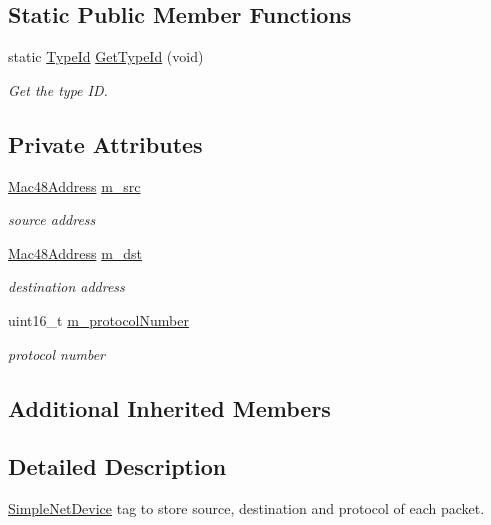\subsection*{Static Public Member Functions}
\begin{DoxyCompactItemize}
\item 
static \hyperlink{classns3_1_1TypeId}{Type\+Id} \hyperlink{classns3_1_1SimpleTag_ab66449eb05fe25c32f740d2e8b469e14}{Get\+Type\+Id} (void)
\begin{DoxyCompactList}\small\item\em Get the type ID. \end{DoxyCompactList}\end{DoxyCompactItemize}
\subsection*{Private Attributes}
\begin{DoxyCompactItemize}
\item 
\hyperlink{classns3_1_1Mac48Address}{Mac48\+Address} \hyperlink{classns3_1_1SimpleTag_a912a8d6c2e5cd521027b914dbdb87782}{m\+\_\+src}
\begin{DoxyCompactList}\small\item\em source address \end{DoxyCompactList}\item 
\hyperlink{classns3_1_1Mac48Address}{Mac48\+Address} \hyperlink{classns3_1_1SimpleTag_a274838a625af595eb1e15dbf58415d80}{m\+\_\+dst}
\begin{DoxyCompactList}\small\item\em destination address \end{DoxyCompactList}\item 
uint16\+\_\+t \hyperlink{classns3_1_1SimpleTag_a3af52bc0388404c543ab680733512f79}{m\+\_\+protocol\+Number}
\begin{DoxyCompactList}\small\item\em protocol number \end{DoxyCompactList}\end{DoxyCompactItemize}
\subsection*{Additional Inherited Members}


\subsection{Detailed Description}
\hyperlink{classns3_1_1SimpleNetDevice}{Simple\+Net\+Device} tag to store source, destination and protocol of each packet. 

